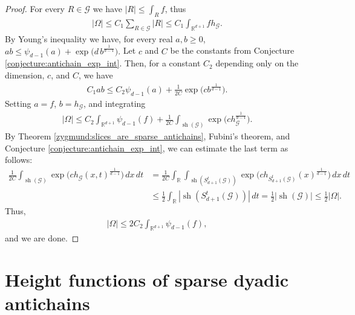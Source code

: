 \documentclass[oneside]{amsart}
\theoremstyle{definition}
\theoremstyle{plain}
\numberwithin{equation}{section}
\numberwithin{theorem}{section}
\newcommand{\sh}{\operatorname{sh}}
\begin{document}
\begin{proof}
  For every $R \in \mathcal{G}$ we have $|R| \leq \int_R f$, thus
  \begin{align*}
    |\Omega| \leq C_1 \sum_{R \in \mathcal{G}} |R|
    \leq C_1 \int_{\mathbb{R}^{d+1}} f h_{\mathcal{G}}.
  \end{align*}
  By Young's inequality we have, for every real $a,b \geq 0$,
  $ab \leq \psi_{d-1}(a) + \exp\big(d\, b^{\frac{1}{d-1}}\big).$
  Let $c$ and $C$ be the constants from Conjecture
  \ref{conjecture:antichain_exp_int}.
  Then, for a constant $C_2$ depending only on the dimension, $c$, and $C$,
  we have
  \begin{align*}
    C_1 ab \leq C_2 \psi_{d-1}(a) +
      \frac{1}{2C} \exp\Big(cb^{\frac{1}{d-1}}\Big).
  \end{align*}
  Setting $a = f$, $b = h_{\mathcal{G}}$, and integrating
  \begin{align*}
    |\Omega| \leq C_2 \int_{\mathbb{R}^{d+1}} \psi_{d-1}(f)
    + \frac{1}{2C} \int_{\sh(\mathcal{G})} \exp\Big(
      c h_{\mathcal{G}}^{\frac{1}{d-1}}
    \Big).
  \end{align*}
  By Theorem \ref{zygmund:slices_are_sparse_antichains}, Fubini's theorem, and
  Conjecture \ref{conjecture:antichain_exp_int}, we can estimate the last term
  as follows:
  \begin{align*}
    \frac{1}{2C}\int_{\sh(\mathcal{G})} \exp\Big(
      c h_{\mathcal{G}}(x,t)^{\frac{1}{d-1}}
    \Big) \, dx \, dt
    &= \frac{1}{2C} \int_{\mathbb{R}} \int_{\sh(S_{d+1}^t(\mathcal{G}))}
      \exp\Big(
        c h_{S_{d+1}^t(\mathcal{G})}(x)^{\frac{1}{d-1}}
      \Big) \, dx \, dt \\
    &\leq \frac{1}{2} \int_{\mathbb{R}} |\sh(S_{d+1}^t(\mathcal{G}))| \, dt
    = \frac{1}{2}|\sh(\mathcal{G})| \leq \frac{1}{2}|\Omega|.
  \end{align*}
  Thus,
  \begin{align*}
    |\Omega| \leq 2C_2 \int_{\mathbb{R}^{d+1}} \psi_{d-1}(f),
  \end{align*}
  and we are done.
\end{proof}

\section{Height functions of sparse dyadic antichains} \label{sec:heights}
\end{document}

